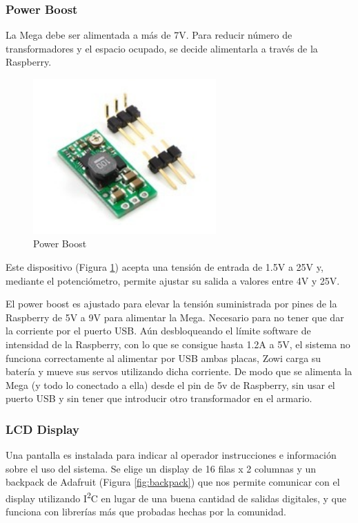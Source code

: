 \subsubsection{Power Boost}

La Mega debe ser alimentada a más de 7V. Para reducir número de transformadores y el espacio ocupado, se decide alimentarla a través de la Raspberry. 

\begin{figure}
\centering
\includegraphics[width=70mm]{Figures/powerBoost}
\caption{Power Boost}
\label{fig:powerBoost}
\end{figure}

Este dispositivo (Figura \ref{fig:powerBoost}) acepta una tensión de entrada de 1.5V a 25V y, mediante el potenciómetro, permite ajustar su salida a valores entre 4V y 25V.

El power boost es ajustado para elevar la tensión suministrada por pines de la Raspberry de 5V a 9V para alimentar la Mega. Necesario para no tener que dar la corriente por el puerto USB. Aún desbloqueando el límite software de intensidad de la Raspberry, con lo que se consigue hasta 1.2A a 5V, el sistema no funciona correctamente al alimentar por USB ambas placas, Zowi carga su batería y mueve sus servos utilizando dicha corriente. De modo que se alimenta la Mega (y todo lo conectado a ella) desde el pin de 5v de Raspberry, sin usar el puerto USB y sin tener que introducir otro transformador en el armario.

\subsubsection{LCD Display}

Una pantalla es instalada para indicar al operador instrucciones e información sobre el uso del sistema. Se elige un display de 16 filas x 2 columnas y un backpack de Adafruit (Figura \ref{fig:backpack}) que nos permite comunicar con el display utilizando I\textsuperscript{2}C en lugar de una buena cantidad de salidas digitales, y que funciona con librerías más que probadas hechas por la comunidad.

